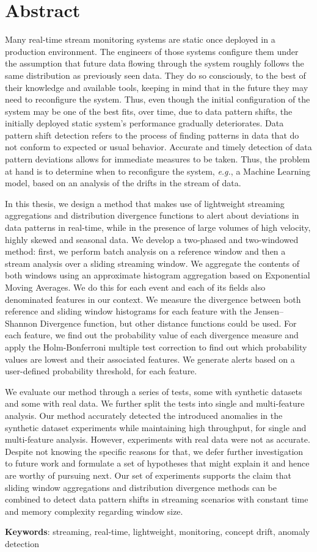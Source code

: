 \chapter*{Abstract}

Many real-time stream monitoring systems are static once deployed in a production environment. The engineers of those systems configure them under the assumption that future data flowing through the system roughly follows the same distribution as previously seen data. They do so consciously, to the best of their knowledge and available tools, keeping in mind that in the future they may need to reconfigure the system. Thus, even though the initial configuration of the system may be one of the best fits, over time, due to data pattern shifts, the initially deployed static system's performance gradually deteriorates. Data pattern shift detection refers to the process of finding patterns in data that do not conform to expected or usual behavior. Accurate and timely detection of data pattern deviations allows for immediate measures to be taken. Thus, the problem at hand is to determine when to reconfigure the system, \textit{e.g.}, a Machine Learning model, based on an analysis of the drifts in the stream of data.

In this thesis, we design a method that makes use of lightweight streaming aggregations and distribution divergence functions to alert about deviations in data patterns in real-time, while in the presence of large volumes of high velocity, highly skewed and seasonal data. We develop a two-phased and two-windowed method: first, we perform batch analysis on a reference window and then a stream analysis over a sliding streaming window. We aggregate the contents of both windows using an approximate histogram aggregation based on Exponential Moving Averages. We do this for each event and each of its fields also denominated features in our context. We measure the divergence between both reference and sliding window histograms for each feature with the Jensen–Shannon Divergence function, but other distance functions could be used. For each feature, we find out the probability value of each divergence measure and apply the Holm-Bonferroni multiple test correction to find out which probability values are lowest and their associated features. We generate alerts based on a user-defined probability threshold, for each feature.

We evaluate our method through a series of tests, some with synthetic datasets and some with real data. We further split the tests into single and multi-feature analysis. Our method accurately detected the introduced anomalies in the synthetic dataset experiments while maintaining high throughput, for single and multi-feature analysis. However, experiments with real data were not as accurate. Despite not knowing the specific reasons for that, we defer further investigation to future work and formulate a set of hypotheses that might explain it and hence are worthy of pursuing next. Our set of experiments supports the claim that sliding window aggregations and distribution divergence methods can be combined to detect data pattern shifts in streaming scenarios with constant time and memory complexity regarding window size.

\vspace*{10mm}\noindent
\textbf{Keywords}: streaming, real-time, lightweight, monitoring, concept drift, anomaly detection

